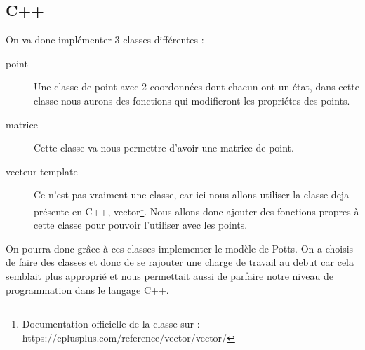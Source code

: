 \begin{article}
    \subsection{C++}
    \noindent On va donc implémenter 3 classes différentes :
    \begin{description}
        \item[point] Une classe de point avec 2 coordonnées dont chacun ont un état, dans cette classe nous aurons des fonctions qui modifieront les propriétes des points.
        \item[matrice] Cette classe va nous permettre d'avoir une matrice de point.
        \item[vecteur-template] Ce n'est pas vraiment une classe, car ici nous allons utiliser la classe deja présente en C++, vector\footnote{Documentation officielle de la classe sur : https://cplusplus.com/reference/vector/vector/}.
        Nous allons donc ajouter des fonctions propres à cette classe pour pouvoir l'utiliser avec les points.
    \end{description}
    \newline
    \newline
    On pourra donc grâce à ces classes implementer le modèle de Potts.
    \newline On a choisis de faire des classes et donc de se rajouter une charge de travail au debut car cela semblait plus approprié et nous permettait aussi de parfaire notre niveau de programmation dans le langage C++.
    \newline
\end{article}